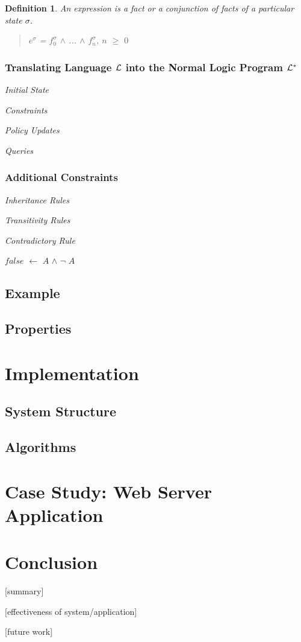 \documentclass[10pt, twocolumn]{article}
\newtheorem{definition}{Definition}
\begin{document}
        \begin{definition}
          An expression is a fact or a conjunction of facts of a particular
          state $\sigma$.

          \begin{quote}
            $e^{\sigma}$ = $f^{\sigma}_{0}$ $\land$ ... $\land$ $f^{\sigma}_{n}$, $n$ $\geq$ $0$
          \end{quote}
        \end{definition}

      \subsubsection{Translating Language ${\cal L}$ into the Normal Logic Program ${\cal L^{*}}$}

        \noindent \emph{Initial State}

        \noindent \emph{Constraints}

        \noindent \emph{Policy Updates}

        \noindent \emph{Queries}

      \subsubsection{Additional Constraints}

        \noindent \emph{Inheritance Rules}

        \noindent \emph{Transitivity Rules}

        \noindent \emph{Contradictory Rule}

          $false$ $\leftarrow$ $A$ $\land$ $\lnot$ $A$

    \subsection{Example}

    \subsection{Properties}

  \section{Implementation}

    \subsection{System Structure}

    \subsection{Algorithms}

  \section{Case Study: Web Server Application}

  \section{Conclusion}

    [summary]

    [effectiveness of system/application]

    [future work]
\end{document}
